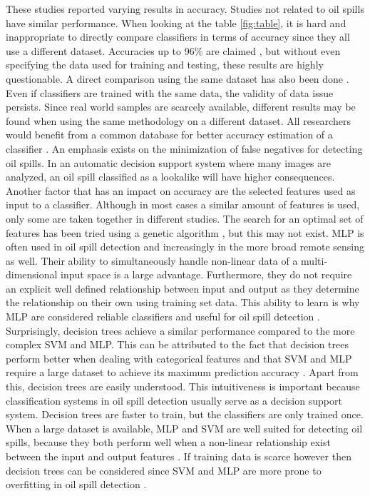 These studies reported varying results in accuracy. Studies not related to oil spills have similar performance. When looking at the table \ref{fig:table}, it is hard and inappropriate to directly compare classifiers in terms of accuracy since they all use a different dataset. Accuracies up to 96\% are claimed \cite{Topouzelis200924}, but without even specifying the data used for training and testing, these results are highly questionable. A direct comparison using the same dataset has also been done \cite{Mera201472} \cite{Xu201414}. Even if classifiers are trained with the same data, the validity of data issue persists. Since real world samples are scarcely available, different results may be found when using the same methodology on a different dataset. All researchers would benefit from a common database for better accuracy estimation of a classifier \cite{Topouzelis200810}. An emphasis exists on the minimization of false negatives for detecting oil spills. In an automatic decision support system where many images are analyzed, an oil spill classified as a lookalike will have higher consequences. Another factor that has an impact on accuracy are the selected features used as input to a classifier. Although in most cases a similar amount of features is used, only some are taken together in different studies. The search for an optimal set of features has been tried using a genetic algorithm \cite{Topouzelis200930}, but this may not exist.
MLP is often used in oil spill detection and increasingly in the more broad remote sensing as well. Their ability to simultaneously handle non-linear data of a multi-dimensional input space is a large advantage. Furthermore, they do not require an explicit well defined relationship between input and output as they determine the relationship on their own using training set data. This ability to learn is why MLP are considered reliable classifiers and useful for oil spill detection \cite{Delfrate200038}. Surprisingly, decision trees achieve a similar performance compared to the more complex SVM and MLP. This can be attributed to the fact that decision trees perform better when dealing with categorical features and that SVM and MLP require a large dataset to achieve its maximum prediction accuracy \cite{kotsiantis2007supervised}. Apart from this, decision trees are easily understood. This intuitiveness is important because classification systems in oil spill detection usually serve as a decision support system. Decision trees are faster to train, but the classifiers are only trained once. When a large dataset is available, MLP and SVM are well suited for detecting oil spills, because they both perform well when a non-linear relationship exist between the input and output features \cite{kotsiantis2007supervised}. If training data is scarce however then decision trees can be considered since SVM and MLP are more prone to overfitting in oil spill detection \cite{Xu201414}.
